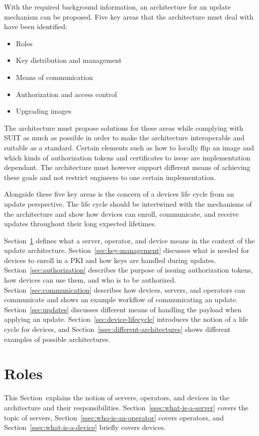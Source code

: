 \documentclass[0-thesis.tex]{subfiles}
\begin{document}
With the required background information, an architecture for an update mechanism can be
proposed. Five key areas that the architecture must deal with have been identified:

\begin{itemize}
    \item Roles
    \item Key distribution and management
    \item Means of communication
    \item Authorization and access control
    \item Upgrading images
\end{itemize}

The architecture must propose solutions for these areas while complying with SUIT as much
as possible in order to make the architecture interoperable and suitable as a standard.
Certain elements such as how to locally flip an image and which kinds of authorization
tokens and certificates to issue are implementation dependant. The architecture must
however support different means of achieving these goals and not restrict engineers to one
certain implementation.

Alongside these five key areas is the concern of a devices life cycle from an update
perspective. The life cycle should be intertwined with the mechanisms of the architecture
and show how devices can enroll, communicate, and receive updates throughout their long
expected lifetimes. 

Section~\ref{sec:roles} defines what a server, operator, and device means in the context
of the update architecture. Section~\ref{sec:key-management} discusses what is needed for
devices to enroll in a PKI and how keys are handled during updates.
Section~\ref{sec:authorization} describes the purpose of issuing authorization tokens, how
devices can use them, and who is to be authorized. Section~\ref{sec:communication}
describes how devices, servers, and operators can communicate and shows an example
workflow of communicating an update. Section~\ref{sec:updates} discusses different means
of handling the payload when applying an update. Section~\ref{sec:device-lifecycle}
introduces the notion of a life cycle for devices, and
Section~\ref{ssec:different-architectures} shows different examples of possible
architectures.

\section{Roles}
\label{sec:roles}
This Section~explains the notion of servers, operators, and devices in the architecture
and their responsibilities. Section~\ref{ssec:what-is-a-server} covers the topic of
servers, Section~\ref{ssec:who-is-an-operator} covers operators, and
Section~\ref{ssec:what-is-a-device} briefly covers devices.
\end{document}

